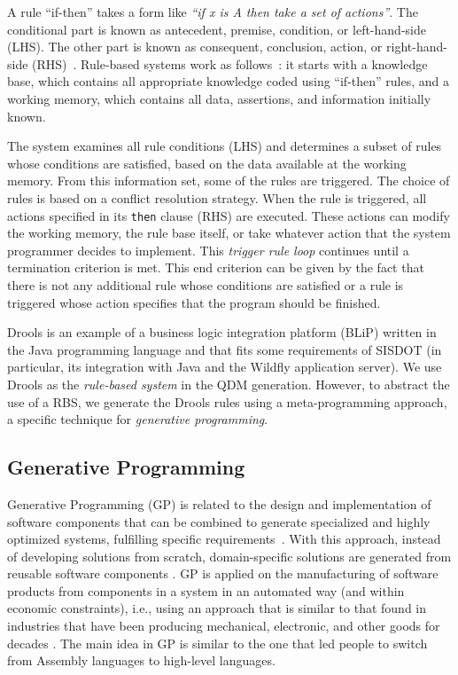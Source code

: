 \documentclass[AMA,STIX1COL]{WileyNJD-v2}
\begin{document}
A rule ``if-then'' takes a form like \emph{``if x is A then take a set of actions''}. The conditional part is known as antecedent, premise, condition, or left-hand-side (LHS). The other part is known as consequent, conclusion, action, or right-hand-side (RHS)~\cite{grosan2011,abraham2005}. Rule-based systems work as follows~\cite{grosan2011}: it starts with a knowledge base, which contains all appropriate knowledge coded using ``if-then'' rules, and a working memory, which contains all data, assertions, and information initially known. 

The system examines all rule conditions (LHS) and determines a subset of rules whose conditions are satisfied, based on the data available at the working memory. From this information set, some of the rules are triggered. The choice of rules is based on a conflict resolution strategy. When the rule is triggered, all actions specified in its \texttt{then} clause (RHS) are executed. These actions can modify the working memory, the rule base itself, or take whatever action that the system programmer decides to implement. This \emph{trigger rule loop} continues until a termination criterion is met. This end criterion can be given by the fact that there is not any additional rule whose conditions are satisfied or a rule is triggered whose action specifies that the program should be finished.

Drools is an example of a business logic integration platform (BLiP) written in the Java programming language and that fits some requirements of SISDOT (in particular, its integration with Java and the Wildfly application server). We use Drools as the \emph{rule-based system} in the QDM generation. However, to abstract the use of a RBS, we generate the Drools rules using a meta-programming approach, a specific technique for \emph{generative programming}. 




\subsection{Generative Programming}
\label{sec:gp}

Generative Programming (GP) is related to the design and implementation of software components that can be combined to generate specialized and highly optimized systems, fulfilling specific requirements~\cite{DBLP:phd/dnb/Czarnecki99}. With this approach, instead of developing solutions from scratch, domain-specific solutions are generated from reusable software components \cite{arora2009}. GP is applied on the manufacturing of software products from components in a system in an automated way (and within economic constraints), i.e., using an approach that is similar to that found in industries that have been producing mechanical, electronic, and other goods for decades \cite{barth2002}. The main idea in GP is similar to the one that led people to switch from Assembly languages to high-level languages. 
\end{document}
